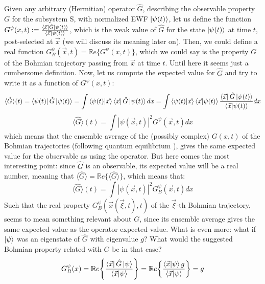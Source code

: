 \documentclass[11pt, a4paper]{article} %
\begin{document}
Given any arbitrary (Hermitian) operator $\hat{G}$, describing the observable property $G$ for the subsystem S, with normalized EWF $\ket{\psi(t)}$, let us define the function $G^{\psi}(x,t):=\frac{\bra{\vec{x}}\hat{G}\ket{\psi(t)}}{\bra{\vec{x}}\ket{\psi(t)}}$, which is the weak value \cite{Weak} of $\hat{G}$ for the state $\ket{\psi(t)}$ at time $t$, post-selected at $\vec{x}$ (we will discuss its meaning later on). Then, we could define a real function $G_B^\psi(\vec{x},t)=\mathbb{R}e\{G^{\psi}(x,t)\}$, which we could say is the property $G$ of the Bohmian trajectory passing from $\vec{x}$ at time $t$. Until here it seems just a cumbersome definition. Now, let us compute the expected value for $\hat{G}$ and try to write it as a function of $G^\psi(x,t)$:
\begin{equation}
\langle \hat{G}\rangle(t)= \bra{\psi(t)}\hat{G}\ket{\psi(t)}=\int \bra{\psi(t)} \ket{\vec{x}}\bra{\vec{x}}\hat{G}\ket{\psi(t)}dx = \int \bra{\psi(t)}\ket{\vec{x}} \bra{\vec{x}}\ket{\psi(t)}\frac{\bra{\vec{x}}\hat{G}\ket{\psi(t)}}{\bra{\vec{x}}\ket{\psi(t)}}dx
\end{equation}
\begin{equation}
\langle \hat{G}\rangle(t)= \int |\psi(\vec{x},t)|^2G^\psi(\vec{x},t)dx
\end{equation}
which means that the ensemble average of the (possibly complex) $G(x,t)$ of the Bohmian trajectories (following quantum equilibrium \cite{Absolute}), gives the same expected value for the observable as using the operator. But here comes the most interesting point: since $\hat{G}$ is an observable, its expected value will be a real number, meaning that $\langle \hat{G}\rangle=\mathbb{R}e\{\langle \hat{G}\rangle\}$, which means that:
\begin{equation}
\langle \hat{G}\rangle(t)=\int |\psi(\vec{x},t)|^2G_B^\psi(\vec{x},t)dx
\end{equation}
Such that the real property $G_B^\psi(\vec{x}(\vec{\xi},t),t)$ of the $\vec{\xi}$-th Bohmian trajectory, seems to mean something relevant about $G$, since its ensemble average gives the same expected value as the operator expected value. What is even more: what if $\ket{\psi}$ was an eigenstate of $\hat{G}$ with eigenvalue $g$? What would the suggested Bohmian property related with $G$ be in that case?
\begin{equation}
G_B^\psi(x)=\mathbb{R}e\qty{ \frac{\bra{\vec{x}}\hat{G}\ket{\psi}}{\bra{\vec{x}}\ket{\psi}} } = \mathbb{R}e\qty{ \frac{\bra{\vec{x}}\ket{\psi}g}{\bra{\vec{x}}\ket{\psi}} }=g
\end{equation}
\end{document}
